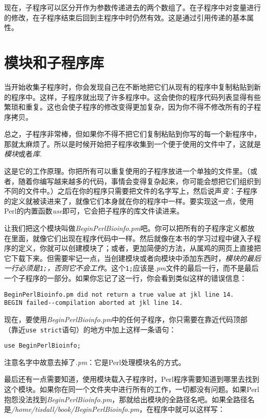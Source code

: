 现在，子程序可以区分开作为参数传递进去的两个数组了。在子程序中对变量进行的修改，在子程序结束后回到主程序中时仍然有效。这是通过引用传递的基本属性。

\section{模块和子程序库}
当开始收集子程序时，你会发现自己在不断地把它们从现有的程序中复制粘贴到新的程序中。这样，子程序就出现了许多程序中。这会使你的程序代码列表显得有些繁琐和重复。这也会使子程序的修改变得更加复杂，因为你不得不修改所有的子程序拷贝。

总之，子程序非常棒，但如果你不得不把它们复制粘贴到你写的每一个新程序中，那就太麻烦了。所以是时候开始把子程序收集到一个便于使用的文件中了，这就是\textit{模块}或者\textit{库}.

这是它的工作原理。你把所有可以重复使用的子程序放进一个单独的文件里。（或者，随着你编写越来越多的代码，事情会变得复杂起来，你可能会想把它们组织到不同的文件中。）之后在你的程序只需要把文件的名字写上，然后说声\textit{变}：子程序的定义就被读进来了，就像它们本身就在你的程序中一样。要实现这一点，使用Perl的内置函数\textit{use}即可，它会把子程序的库文件读进来。

让我们把这个模块叫做\textit{BeginPerlBioinfo.pm}吧。你可以把所有的子程序定义都放在里面，就像它们出现在程序代码中一样。然后就像在本书的学习过程中键入子程序的定义，你就可以创建模块了；或者，更加简便的方法，从属鸡的网页上直接把它下载下来。但需要牢记一点，当创建模块或者向模块中添加东西时，\textit{模块的最后一行必须是\texttt{1;}，否则它不会工作}。这个\verb|1;|应该是\textit{.pm}文件的最后一行，而不是最后一个子程序的一部分。如果你忘记了这一行，你会看到类似这样的错误信息：

\begin{lstlisting}
BeginPerlBioinfo.pm did not return a true value at jkl line 14.
BEGIN failed--compilation aborted at jkl line 14.
\end{lstlisting}

现在，要使用\textit{BeginPerlBioinfo.pm}中的任何子程序，你只需要在靠近代码顶部（靠近\verb|use strict|语句）的地方中加上这样一条语句：

\begin{lstlisting}
use BeginPerlBioinfo;
\end{lstlisting}

注意名字中故意去掉了\textit{.pm}：它是Perl处理模块名的方式。

最后还有一点需要知道，使用模块载入子程序时，Perl程序需要知道到哪里去找到这个模块。如果你在同一个文件夹中进行所有的工作，一切都没有问题。如果Perl抱怨没法找到\textit{BeginPerlBioinfo.pm}，那就给出模块的全路径名吧。如果全路径名是\textit{/home/tisdall/book/BeginPerlBioinfo.pm}，在程序中就可以这样写：


